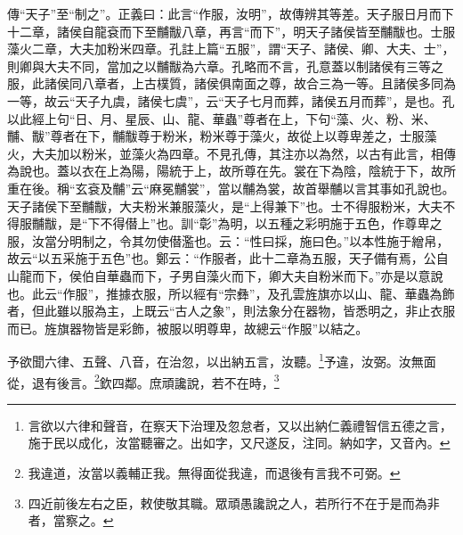 {\noindent\zhuan{}\fzbyks 傳“天子”至“制之”。正義曰：此言“作服，汝明”，故傳辨其等差。天子服日月而下十二章，諸侯自龍袞而下至黼黻八章，再言“而下”，明天子諸侯皆至黼黻也。士服藻火二章，大夫加粉米四章。孔註上篇“五服”，謂“天子、諸侯、卿、大夫、士”，則卿與大夫不同，當加之以黼黻為六章。孔略而不言，孔意蓋以制諸侯有三等之服，此諸侯同八章者，上古樸質，諸侯俱南面之尊，故合三為一等。且諸侯多同為一等，故云“天子九虞，諸侯七虞”，云“天子七月而葬，諸侯五月而葬”，是也。孔以此經上句“日、月、星辰、山、龍、華蟲”尊者在上，下句“藻、火、粉、米、黼、黻”尊者在下，黼黻尊于粉米，粉米尊于藻火，故從上以尊卑差之，士服藻火，大夫加以粉米，並藻火為四章。不見孔傳，其注亦以為然，以古有此言，相傳為說也。蓋以衣在上為陽，陽統于上，故所尊在先。裳在下為陰，陰統于下，故所重在後。稱“玄袞及黼”云“麻冕黼裳”，當以黼為裳，故首舉黼以言其事如孔說也。天子諸侯下至黼黻，大夫粉米兼服藻火，是“上得兼下”也。士不得服粉米，大夫不得服黼黻，是“下不得僣上”也。訓“彰”為明，以五種之彩明施于五色，作尊卑之服，汝當分明制之，令其勿使僣濫也。云：“性曰採，施曰色。”以本性施于繒帛，故云“以五采施于五色”也。鄭云：“作服者，此十二章為五服，天子備有焉，公自山龍而下，侯伯自華蟲而下，子男自藻火而下，卿大夫自粉米而下。”亦是以意說也。此云“作服”，推據衣服，所以經有“宗彝”，及孔雲旌旗亦以山、龍、華蟲為飾者，但此雖以服為主，上既云“古人之象”，則法象分在器物，皆悉明之，非止衣服而已。旌旗器物皆是彩飾，被服以明尊卑，故總云“作服”以結之。 \par}

予欲聞六律、五聲、八音，在治忽，以出納五言，汝聽。\footnote{言欲以六律和聲音，在察天下治理及忽怠者，又以出納仁義禮智信五德之言，施于民以成化，汝當聽審之。出如字，又尺遂反，注同。納如字，又音內。}予違，汝弼。汝無面從，退有後言。\footnote{我違道，汝當以義輔正我。無得面從我違，而退後有言我不可弼。}欽四鄰。庶頑讒說，若不在時，\footnote{四近前後左右之臣，敕使敬其職。眾頑愚讒說之人，若所行不在于是而為非者，當察之。}


